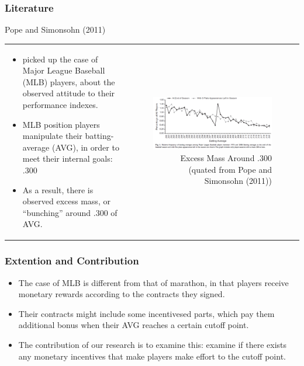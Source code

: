 \documentclass[dvipdfmx,12pt]{beamer}
\begin{document}
\begin{frame}\frametitle{Literature}
  \small
  Pope and Simonsohn (2011)
  \begin{tabular}{lr}
    \begin{minipage}[H]{0.45\textwidth}
      \footnotesize
      \begin{itemize}
        \item picked up the case of Major League Baseball (MLB) players, about the observed attitude to their performance indexes.

        \item MLB position players manipulate their batting-average (AVG), in order to meet their internal goals: .300

        \item As a result, there is observed excess mass, or ``bunching'' around .300 of AVG.
      \end{itemize}

    \end{minipage} &
    \begin{minipage}[H]{0.55\textwidth}
      \begin{figure}
        \includegraphics[keepaspectratio, scale = 0.33]{graphs/PS_fig1}
        \caption{Excess Mass Around .300 (quated from Pope and Simonsohn (2011))}
        \label{PS_fig}
      \end{figure}
    \end{minipage}
  \end{tabular}

\end{frame}

\begin{frame}\frametitle{Extention and Contribution}
\begin{itemize}
  \item The case of MLB is different from that of marathon, in that players receive monetary rewards according to the contracts they signed.

  \item Their contracts might include some incentivesed parts, which pay them additional bonus when their AVG reaches a certain cutoff point.

  \item The contribution of our research is to examine this: examine if there exists any monetary incentives that make players make effort to the cutoff point.
\end{itemize}
\end{frame}
\end{document}
